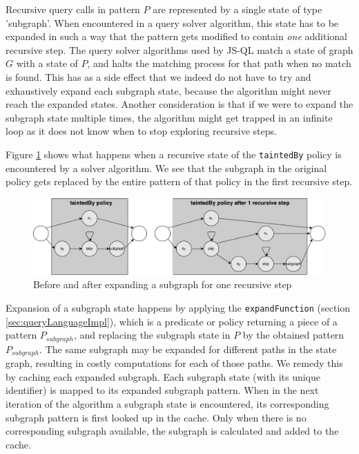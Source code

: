 Recursive query calls in pattern $P$ are represented by a single state of type 'subgraph'. When encountered in a query solver algorithm, this state has to be expanded in such a way that the pattern gets modified to contain \textit{one} additional recursive step. The query solver algorithms used by JS-QL match a state of graph $G$ with a state of $P$, and halts the matching process for that path when no match is found. This has as a side effect that we indeed do not have to try and exhaustively expand each subgraph state, because the algorithm might never reach the expanded states. Another consideration is that if we were to expand the subgraph state multiple times, the algorithm might get trapped in an infinite loop as it does not know when to stop exploring recursive steps. 

Figure \ref{fig:subgraphExpansion} shows what happens when a recursive state of the \texttt{taintedBy} policy is encountered by a solver algorithm. We see that the subgraph in the original policy gets replaced by the entire pattern of that policy in the first recursive step.

\begin{figure}[!h]
    \centering
      \includegraphics[width=1\textwidth]{images/subgraphExpansion} 
      \caption{Before and after expanding a subgraph for one recursive step}
    \label{fig:subgraphExpansion}
\end{figure}

Expansion of a subgraph state happens by applying the \texttt{expandFunction} (section \ref{sec:queryLanguageImpl}), which is a predicate or policy returning a piece of a pattern $P_{subgraph}$, and replacing the subgraph state in $P$ by the obtained pattern $P_{subgraph}$. The same subgraph may be expanded for different paths in the state graph, resulting in costly computations for each of those paths. We remedy this by caching each expanded subgraph. Each subgraph state (with its unique identifier) is mapped to its expanded subgraph pattern. When in the next iteration of the algorithm a subgraph state is encountered, its corresponding subgraph pattern is first looked up in the cache. Only when there is no corresponding subgraph available, the subgraph is calculated and added to the cache.


